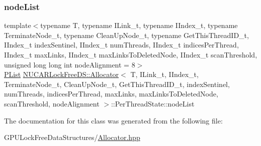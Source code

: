 \subsubsection{\texorpdfstring{node\+List}{nodeList}}
{\footnotesize\ttfamily template$<$typename T, typename I\+Link\+\_\+t, typename I\+Index\+\_\+t, typename Terminate\+Node\+\_\+t, typename Clean\+Up\+Node\+\_\+t, typename Get\+This\+Thread\+I\+D\+\_\+t, I\+Index\+\_\+t index\+Sentinel, I\+Index\+\_\+t num\+Threads, I\+Index\+\_\+t indices\+Per\+Thread, I\+Index\+\_\+t max\+Links, I\+Index\+\_\+t max\+Links\+To\+Deleted\+Node, I\+Index\+\_\+t scan\+Threshold, unsigned long long int node\+Alignment = 8$>$ \\
\mbox{\hyperlink{class_n_u_c_a_r_lock_free_d_s_1_1_allocator_1_1_p_list}{P\+List}} \mbox{\hyperlink{class_n_u_c_a_r_lock_free_d_s_1_1_allocator}{N\+U\+C\+A\+R\+Lock\+Free\+D\+S\+::\+Allocator}}$<$ T, I\+Link\+\_\+t, I\+Index\+\_\+t, Terminate\+Node\+\_\+t, Clean\+Up\+Node\+\_\+t, Get\+This\+Thread\+I\+D\+\_\+t, index\+Sentinel, num\+Threads, indices\+Per\+Thread, max\+Links, max\+Links\+To\+Deleted\+Node, scan\+Threshold, node\+Alignment $>$\+::Per\+Thread\+State\+::node\+List}



The documentation for this class was generated from the following file\+:\begin{DoxyCompactItemize}
\item 
G\+P\+U\+Lock\+Free\+Data\+Structures/\mbox{\hyperlink{_allocator_8hpp}{Allocator.\+hpp}}\end{DoxyCompactItemize}

